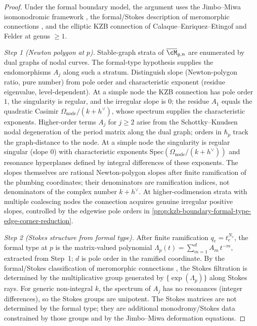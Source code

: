 \begin{proof}
Under the formal boundary model, the argument uses the
Jimbo--Miwa isomonodromic framework
\cite{JMU81}, the formal/Stokes description of meromorphic
connections \cite{Boalch2001,Boalch2014}, and the elliptic KZB
connection of Calaque--Enriquez--Etingof and Felder
\cite{CEE2009,Fel94} at genus \(\ge 1\).

\emph{Step 1 (Newton polygon at \(p\)).}
Stable-graph strata of \(\overline{\cM}_{g,n}\) are enumerated by
dual graphs of nodal curves. The formal-type hypothesis supplies
the endomorphisms \(A_j\) along such a stratum. Distinguish slope
(Newton-polygon
ratio, pure number) from pole order and characteristic exponent
(residue eigenvalue, level-dependent). At a simple node the KZB
connection has pole order \(1\), the singularity is regular, and
the irregular slope is \(0\); the residue \(A_{1}\) equals the
quadratic Casimir
\(\Omega_{\mathrm{node}}/(k + h^{\vee})\), whose spectrum supplies
the characteristic exponents. Higher-order terms \(A_{j}\) for
\(j \ge 2\) arise from the Schottky--Knudsen nodal degeneration
\cite{Knudsen83, Mumford83} of the period matrix along the dual
graph; orders in \(\hbar_{p}\) track the graph-distance to the
node. At a simple node the singularity is regular singular (slope \(0\))
with characteristic exponents
\(\mathrm{Spec}(\Omega_{\mathrm{node}}/(k + h^{\vee}))\) and
resonance hyperplanes defined by integral differences of these
exponents. The slopes themselves are rational Newton-polygon
slopes after finite ramification of the plumbing coordinates; their
denominators are ramification indices, not denominators of the
complex number \(k+h^\vee\). At higher-codimension strata with
multiple coalescing nodes the connection acquires genuine irregular
positive slopes, controlled by the edgewise pole orders in
\autoref{prop:kzb-boundary-formal-type-edge-corner-reduction}.

\emph{Step 2 (Stokes structure from formal type).}
After finite ramification \(q_{e}=t_{e}^{N_{e}}\), the formal type at
\(p\) is the matrix-valued polynomial
\(\Lambda_{p}(t) = \sum_{m = 1}^{d} A_{m}\,t^{-m}\), extracted
from Step~1; \(d\) is pole order in the ramified coordinate. By the
formal/Stokes classification of meromorphic
connections \cite{Boalch2001,Boalch2014}, the Stokes filtration is
determined by the multiplicative group generated by
\(\{\exp(\Lambda_{p})\}\) along Stokes rays. For generic
non-integral \(k\), the spectrum of \(A_{j}\) has no resonances
(integer differences), so the Stokes groups are unipotent. The
Stokes matrices are not determined by the formal type; they are
additional monodromy/Stokes data constrained by those groups and by
the Jimbo--Miwa deformation equations.


\end{proof}
